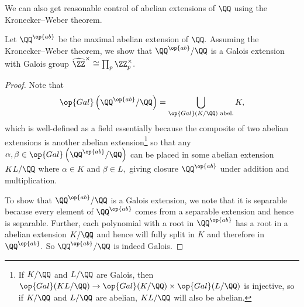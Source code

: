 \documentclass[../notes.tex]{subfiles}
\begin{document}
We can also get reasonable control of abelian extensions of $\QQ$ using the Kronecker--Weber theorem.
\begin{exe}
	Let $\QQ^{\op{ab}}$ be the maximal abelian extension of $\QQ.$ Assuming the Kronecker--Weber theorem, we show that $\QQ^{\op{ab}}/\QQ$ is a Galois extension with Galois group $\widehat{\ZZ}^\times\cong\prod_p\ZZ_p^\times.$
\end{exe}
\begin{proof}
	Note that
	\[\op{Gal}\left(\QQ^{\op{ab}}/\QQ\right)=\bigcup_{\op{Gal}(K/\QQ)\text{ abel.}}K,\]
	which is well-defined as a field essentially because the composite of two abelian extensions is another abelian extension\footnote{If $K/\QQ$ and $L/\QQ$ are Galois, then $\op{Gal}(KL/\QQ)\to\op{Gal}(K/\QQ)\times\op{Gal}(L/\QQ)$ is injective, so if $K/\QQ$ and $L/\QQ$ are abelian, $KL/\QQ$ will also be abelian.} so that any $\alpha,\beta\in\op{Gal}\left(\QQ^{\op{ab}}/\QQ\right)$ can be placed in some abelian extension $KL/\QQ$ where $\alpha\in K$ and $\beta\in L,$ giving closure $\QQ^{\op{ab}}$ under addition and multiplication.

	To show that $\QQ^{\op{ab}}/\QQ$ is a Galois extension, we note that it is separable because every element of $\QQ^{\op{ab}}$ comes from a separable extension and hence is separable. Further, each polynomial with a root in $\QQ^{\op{ab}}$ has a root in a abelian extension $K/\QQ$ and hence will fully split in $K$ and therefore in $\QQ^{\op{ab}}.$ So $\QQ^{\op{ab}}/\QQ$ is indeed Galois.


\end{proof}
\end{document}
